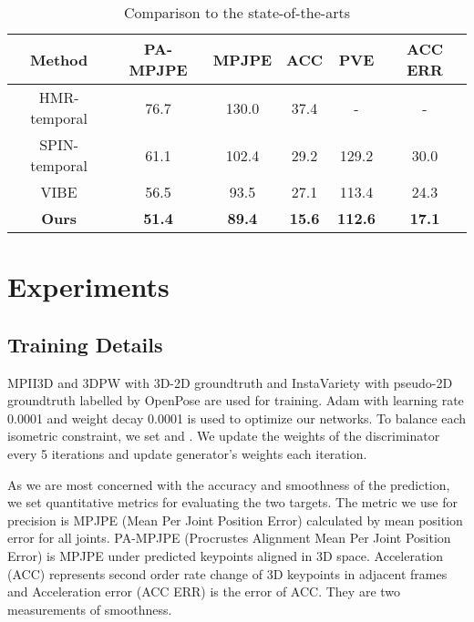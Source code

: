 \documentclass{svproc}
\begin{document}
\begin{table}
\centering
\caption{Comparison to the state-of-the-arts}
\label{table}
\small
\setlength{\tabcolsep}{3pt}
\begin{tabular}{|c|c|c|c|c|c|}
\hline
Method & 
PA-MPJPE & 
MPJPE & ACC & PVE & ACC ERR \\
\hline
HMR-temporal \cite{kanazawa2018end} & 
76.7 & 
130.0 & 
37.4 & - & - \\
\hline
SPIN-temporal \cite{kolotouros2019learning} & 
61.1 & 
102.4 & 
29.2 & 129.2 & 30.0 \\
\hline
VIBE \cite{kocabas2020vibe} & 
56.5 & 
93.5 & 
27.1 & 113.4 & 24.3 \\
\hline
\textbf{Ours} & 
\textbf{51.4} & 
\textbf{89.4} & 
\textbf{15.6} & 
\textbf{112.6} & 
\textbf{17.1} \\
\hline
\end{tabular}
\label{tab1}
\end{table}






\section{Experiments}
\subsection{Training Details}

MPII3D\cite{mehta2017monocular} and 3DPW \cite{von2018recovering} with 3D-2D groundtruth and InstaVariety\cite{kanazawa2019learning} with pseudo-2D groundtruth labelled by OpenPose\cite{cao2017realtime} are used for training. Adam\cite{kingma2014adam} with learning rate 0.0001 and weight decay 0.0001 is used to optimize our networks. To balance each isometric constraint, we set  and . We update the weights of the discriminator every 5 iterations and update generator's weights each iteration.


As we are most concerned with the accuracy and smoothness of the prediction, we set quantitative metrics for evaluating the two targets. The metric we use for precision is MPJPE (Mean Per Joint Position Error) calculated by mean position error for all joints. PA-MPJPE (Procrustes Alignment Mean Per Joint Position Error) is MPJPE under predicted keypoints aligned in 3D space. Acceleration (ACC) represents second order rate change of 3D keypoints in adjacent frames and Acceleration error (ACC ERR) is the error of ACC. They are two measurements of smoothness. 
\end{document}
